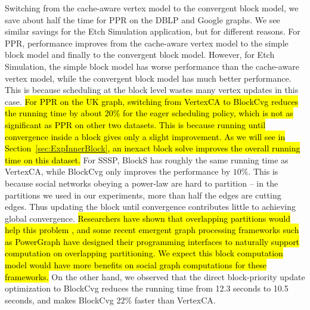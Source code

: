 Switching from the cache-aware vertex model to the convergent block
model, we save about half the time 
for PPR on the DBLP and Google graphs.  We see similar savings for
the Etch Simulation application, but for
different reasons.  For PPR, performance improves from the cache-aware
vertex model to the simple block model and finally to the convergent
block model.  However, for Etch Simulation, the simple block model has
worse performance than the cache-aware vertex model, while the
convergent block model has much better performance.  This is because
scheduling at the block level 
wastes many
vertex updates in this case. 
\hl{For PPR on the UK graph, switching from VertexCA to BlockCvg reduces the running time by about
$20\%$ for the eager scheduling policy, which is not as significant as PPR on other two 
datasets. This is because running until convergence inside a block
gives only a slight improvement. As we will see in
Section~{\ref{sec:ExpInnerBlock}}, 
an inexact block solve improves
the overall running time on this dataset.  }
For SSSP, BlockS has roughly the same running time as VertexCA, while BlockCvg
only improves the performance by $10\%$.
This is because social networks
obeying a power-law are hard to partition -- in the partitions we used
in our experiments, more than half the edges are cutting edges.  Thus
updating the block until convergence contributes little to achieving
global convergence.  
\hl{Researchers have shown that overlapping partitions would help this problem {\cite{AndersenGM:2012}}, and some recent emergent graph processing
frameworks such as PowerGraph {\cite{Gonzalez+12:PowerGraph}} have designed 
their programming interfaces to naturally support computation on overlapping partitioning. 
We expect this block computation model would have more benefits on 
social graph computations for these frameworks.}
On the other hand, we observed that %
the direct block-priority update optimization to BlockCvg 
reduces the running time from 12.3 seconds to 10.5 seconds, and makes BlockCvg
$22\%$ faster than VertexCA.

